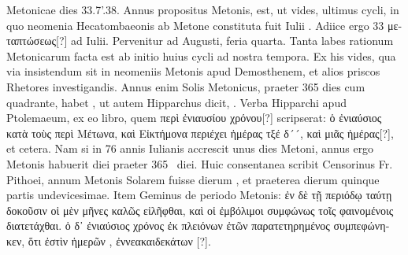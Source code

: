 Metonicae dies 33.7'.38.
Annus propositus Metonis,
est, ut vides, ultimus cycli, in quo neomenia
Hecatombaeonis ab Metone constituta fuit
Iulii .
%
Adiice ergo 33 \textgreek{μεταπτώσεως[?]}
 ad  Iulii.
Pervenitur ad
 Augusti, feria quarta.
Tanta labes rationum Metonicarum facta
est ab initio huius cycli ad nostra tempora.
Ex his vides, qua via
insistendum sit in neomeniis Metonis apud Demosthenem, et alios
priscos Rhetores investigandis.
Annus enim Solis Metonicus, praeter
365 dies cum quadrante, habet , ut autem Hipparchus dicit,
 .
Verba
Hipparchi apud Ptolemaeum, ex eo libro, quem \textgreek{περὶ ἐνιαυσίου χρόνου[?]}
scripserat: \textgreek{ὁ ἐνιαύσιος κατὰ τοὺς περὶ Μέτωνα,
 καὶ Εἰκτήμονα περιέχει ἡμέρας
τξέ δ´´, καὶ  μιᾶς ἡμέρας[?]}, et cetera.
Nam si in 76 annis Iulianis accrescit
unus dies Metoni, annus ergo Metonis habuerit  diei praeter
 365~
diei.
Huic consentanea scribit Censorinus Fr. %
Pithoei, annum Metonis
Solarem fuisse dierum , et praeterea dierum quinque
partis undevicesimae.
Item Geminus de periodo Metonis: \textgreek{ἐν δὲ
τῇ περιόδῳ ταύτῃ δοκοῦσιν οἱ μὲν μῆνες καλῶς εἰλῆφθαι, καὶ οἱ ἐμβόλιμοι
συμφώνως τοῖς φαινομένοις διατετάχθαι. ὁ δ᾽ ἐνιαύσιος χρόνος ἐκ πλειόνων
ἐτῶν παρατετηρημένος συμπεφώνηκεν, ὅτι ἐστὶν ἡμερῶν },
 \textgreek{ἐννεακαιδεκάτων } [?].
